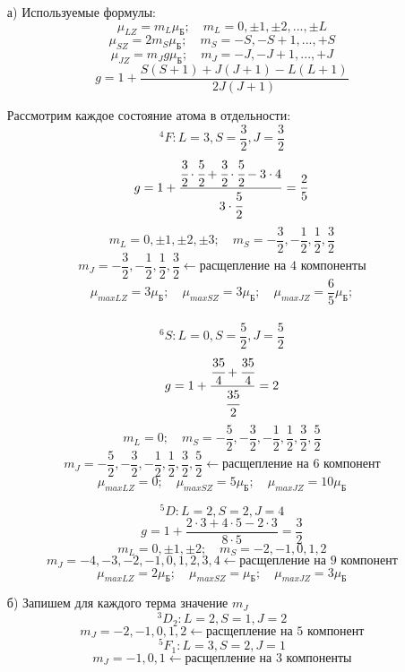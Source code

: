 		\vspace*{-1em}
		\begin{itemize}\itemsep-8pt
			\item[а)] Используемые формулы:
			\[ 
				\mu_{LZ} = m_L\mu_\text{Б};\quad
				m_L = 0, \pm1, \pm2, ..., \pm L 
			\]
			\[ 
				\mu_{SZ} = 2m_S\mu_\text{Б};\quad
				m_S = -S, -S+1, ..., +S  
			\]
			\[ 
				\mu_{JZ} = m_J g\mu_\text{Б};\quad
				m_J = -J, -J+1, ..., +J  
			\]
			\[ g = 1 + \frac{S(S+1)+J(J+1)-L(L+1)}{2J(J+1)} \]

			Рассмотрим каждое состояние атома в отдельности:
			\[ ^4F: L=3, S=\frac{3}{2}, J= \frac{3}{2} \]
			\[ 
				g = 1 + \frac{\cfrac{3}{2}\cdot\cfrac{5}{2} 
				+ \cfrac{3}{2}\cdot\cfrac{5}{2} - 3\cdot4}{3\cdot\cfrac{5}{2}} 
				= \frac{2}{5}  
			\]
			\[ 
				m_L = 0, \pm1, \pm2, \pm3;\quad
				m_S = -\frac{3}{2}, -\frac{1}{2}, \frac{1}{2}, \frac{3}{2}
			\]
			\[
				m_J = -\frac{3}{2}, -\frac{1}{2}, \frac{1}{2}, \frac{3}{2} \leftarrow 
				\text{расщепление на 4 компоненты}
			\]
			\[ 
				\mu_{maxLZ} = 3\mu_\text{Б};\quad
				\mu_{maxSZ} = 3\mu_\text{Б};\quad
				\mu_{maxJZ} = \frac{6}{5}\mu_\text{Б};
			\] \\

			\[ ^6S: L=0, S=\frac{5}{2}, J= \frac{5}{2} \]
			\[ 
                g = 1 + \frac{\cfrac{35}{4}+\cfrac{35}{4}}{\cfrac{35}{2}} 
                = 2
            \]
			\[ 
				m_L = 0;\quad
				m_S = -\frac{5}{2}, -\frac{3}{2}, -\frac{1}{2}, 
				\frac{1}{2}, \frac{3}{2}, \frac{5}{2}
			\]
			\[
				m_J = -\frac{5}{2}, -\frac{3}{2}, -\frac{1}{2}, \frac{1}{2}, 
				\frac{3}{2}, \frac{5}{2} \leftarrow \text{расщепление на 6 компонент}
			\]
			\[ 
				\mu_{maxLZ} = 0;\quad
				\mu_{maxSZ} = 5\mu_\text{Б};\quad
				\mu_{maxJZ} = 10\mu_\text{Б}
			\]

			\[ ^5D: L=2, S=2, J=4\]
			\[ 
                g = 1 + \frac{2\cdot3 + 4\cdot5 - 2\cdot3}{8\cdot5} = 
                \frac{3}{2}
            \]
			\[ 
				m_L = 0, \pm1, \pm2;\quad
				m_S = -2, -1, 0, 1, 2
			\]
			\[
				m_J = -4, -3, -2, -1, 0, 1, 2, 3, 4 \leftarrow 
				\text{расщепление на 9 компонент}
			\]
			\[ 
				\mu_{maxLZ} = 2\mu_\text{Б};\quad
				\mu_{maxSZ} = \mu_\text{Б};\quad
				\mu_{maxJZ} = 3\mu_\text{Б}
			\]
			\item[б)] Запишем для каждого терма значение \( m_J \)
			\[ ^3D_2: L=2, S=1, J=2 \]
			\[ 
                m_J = -2, -1, 0, 1, 2 \leftarrow 
                \text{расщепление на 5 компонент} \]
			\[ ^5F_1: L=3, S=2, J=1 \]
			\[ 
                m_J = -1, 0, 1 \leftarrow 
                \text{расщепление на 3 компоненты} 
            \]
		\end{itemize}

